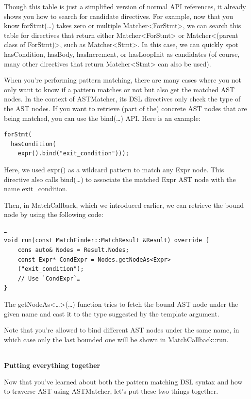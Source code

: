 Though this table is just a simplified version of normal API references, it already shows you how to search for candidate directives. For example, now that you know forStmt(…) takes zero or multiple Matcher<ForStmt>, we can search this table for directives that return either Matcher<ForStmt> or Matcher<(parent class of ForStmt)>, such as Matcher<Stmt>. In this case, we can quickly spot hasCondition, hasBody, hasIncrement, or hasLoopInit as candidates (of course, many other directives that return Matcher<Stmt> can also be used).

When you're performing pattern matching, there are many cases where you not only want to know if a pattern matches or not but also get the matched AST nodes. In the context of ASTMatcher, its DSL directives only check the type of the AST nodes. If you want to retrieve (part of the) concrete AST nodes that are being matched, you can use the bind(…) API. Here is an example:

\begin{lstlisting}[style=styleCXX]
forStmt(
  hasCondition(
    expr().bind("exit_condition")));
\end{lstlisting}

Here, we used expr() as a wildcard pattern to match any Expr node. This directive also calls bind(…) to associate the matched Expr AST node with the name exit\_condition.

Then, in MatchCallback, which we introduced earlier, we can retrieve the bound node by using the following code:

\begin{lstlisting}[style=styleCXX]
…
void run(const MatchFinder::MatchResult &Result) override {
	cons auto& Nodes = Result.Nodes;
	const Expr* CondExpr = Nodes.getNodeAs<Expr>
	("exit_condition");
	// Use `CondExpr`…
}
\end{lstlisting}

The getNodeAs<…>(…) function tries to fetch the bound AST node under the given name and cast it to the type suggested by the template argument. 

Note that you're allowed to bind different AST nodes under the same name, in which case only the last bounded one will be shown in MatchCallback::run.

\hspace*{\fill} \\ %
\noindent
\textbf{Putting everything together}

Now that you've learned about both the pattern matching DSL syntax and how to traverse AST using ASTMatcher, let's put these two things together.

